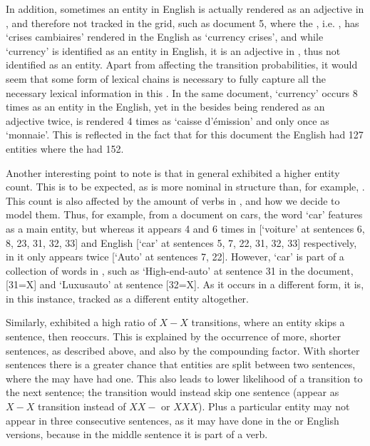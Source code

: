 \documentclass[output=paper]{langsci/langscibook.cls}
\begin{document}
In addition, sometimes an entity in English is actually rendered as an adjective in , and therefore not tracked in the grid, such as document 5, where the , i.e. , has `crises cambiaires' rendered in the English as `currency crises', and while `currency' is identified as an entity in English, it is an adjective in , thus not identified as an entity. Apart from affecting the transition probabilities, it would seem that some form of lexical chains is necessary to fully capture all the necessary lexical information in this .
In the same document, `currency' occurs 8 times as an entity in the English, yet in the  besides being rendered as an adjective twice, is rendered 4 times as `caisse d'\'{e}mission' and only once as `monnaie'. This is reflected in the fact that for this document the English had 127 entities where the  had 152.

Another interesting point to note is that in general  exhibited a higher entity count. This is to be expected, as  is more nominal in structure than, for example, . This count is also affected by the amount of  verbs in , and how we decide to model them. Thus, for example, from a document on cars, the word `car' features as a main entity, but whereas it appears 4 and 6 times in  [`voiture' at sentences 6, 8, 23, 31, 32, 33] and  English [`car' at sentences 5, 7, 22, 31, 32, 33] respectively, in  it only appears twice [`Auto' at sentences 7, 22].
However, `car' is part of a collection of  words in , such as `High-end-auto' at sentence 31 in the document, [{31=X}] and `Luxusauto' at sentence [{32=X}]. As it occurs in a different form, it is, in this instance, tracked as a different entity altogether.

Similarly,  exhibited a high ratio of $X-X$ transitions, where an entity skips a sentence, then reoccurs. This is explained by the occurrence of more, shorter sentences, as described above, and also by the compounding factor. With shorter sentences there is a greater chance that entities are split between two sentences, where the  may have had one. This also leads to lower likelihood of a transition to the next sentence; the transition would instead skip one sentence (appear as $X-X$ transition instead of $XX-$ or $XXX$). Plus a particular entity may not appear in three consecutive sentences, as it may have done in the  or English versions, because in the middle sentence it is part of a  verb. 
\end{document}

